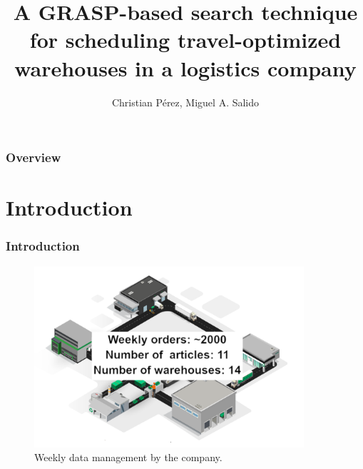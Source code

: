\documentclass[t,compress,11pt,xcolor=dvipsnames,pdf,english]{beamer}
\title{A GRASP-based search technique for scheduling travel-optimized warehouses in a logistics company} %
\author{Christian Pérez, Miguel A. Salido} %
\institute[UPV] %
{
Universitat Politécnica de Valencia \\ %
\medskip
\textit{cripeber@upv.es, msalido@dsic.upv.es} %
}
\date{} %
\begin{document}
\begin{frame}[c]{ }
    \titlepage %
    \end{frame}

\begin{frame}[c]{ }
\frametitle{Overview} %
\tableofcontents %
\end{frame}


\section{Introduction}

\begin{frame}[c]{ }
    \frametitle{Introduction}
    \begin{figure}
        \includegraphics[width=10cm]{img/map_data.png}
        \centering
        \caption{Weekly data management by the company.}
    \end{figure}
\end{frame}
\end{document}
